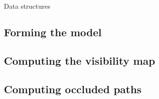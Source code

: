 \begin{frame}{Data structures}

\end{frame}

\subsection{Forming the model}


\subsection{Computing the visibility map}


\subsection{Computing occluded paths}

